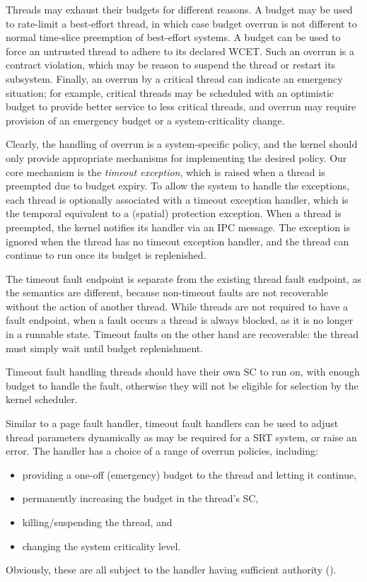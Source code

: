 Threads may exhaust their budgets for different reasons. A budget may
be used to rate-limit a best-effort thread, in which case budget
overrun is not different to normal time-slice preemption of
best-effort systems. A budget can be used to force an untrusted thread
to adhere to its declared WCET. Such an overrun is a contract violation, which may be reason
to suspend the thread or restart its subsystem. Finally, an overrun by
a critical thread can indicate an emergency situation; for example,
critical threads may be scheduled with an optimistic budget to provide
better service to less critical threads, and overrun may require
provision of an emergency budget or a system-criticality change.

Clearly, the handling of overrun is a system-specific policy, and the
kernel should only provide appropriate
mechanisms for implementing the desired policy. Our core mechanism is
the \emph{timeout exception}, which is raised when a thread is
preempted due to budget expiry. To allow the system to handle the exceptions, each thread
is optionally associated with a timeout exception handler, which is
the temporal equivalent to a (spatial) protection exception. When a
thread is preempted, the kernel notifies its handler via an IPC message. The
exception is ignored when the thread has no timeout exception handler, and the thread
can continue to run once its budget is replenished.

The timeout fault
endpoint is separate from the existing thread fault endpoint, as the semantics are different,
because non-timeout faults are not recoverable without the action of another thread. 
While threads are not required to have a fault endpoint, when a fault occurs a thread is always
blocked, as it is no longer in a runnable state. Timeout faults on the other hand are recoverable:
the thread must simply wait until budget replenishment. 

Timeout fault handling threads should have their own \gls{SC} to run on, with enough budget to handle
the fault, otherwise they will not be eligible for selection by the kernel scheduler.

Similar to a page fault handler, timeout fault handlers can be used to adjust thread parameters dynamically as may be required for a \gls{SRT} system, or raise an error.
The handler has a choice of a range of overrun policies, including:
\begin{itemize}
      \item providing a one-off (emergency) budget to the thread and letting it continue,
       \item permanently increasing the budget in the thread's SC,
       \item killing/suspending the thread, and
       \item changing the system criticality level.
       \end{itemize}
Obviously, these are all subject to the handler having sufficient
authority (\eg \schedcontrol).

